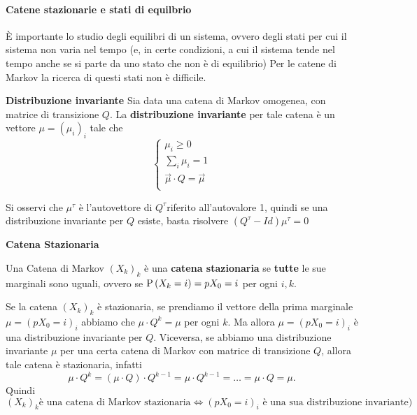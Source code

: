 \paragraph{Catene stazionarie e stati di equilbrio}

\`E importante lo studio degli equilibri di un sistema, ovvero degli stati per cui il sistema non varia nel tempo 
(e, in certe condizioni, a cui il sistema tende nel tempo anche se si parte da uno stato che non \`e di equilibrio)
Per le catene di Markov la ricerca di questi stati non \`e difficile. 

\begin{defn}
	\textbf{Distribuzione invariante}
	Sia data una catena di Markov omogenea, con  matrice di transizione $ Q $. 
	La \textbf{distribuzione invariante} 
	per tale catena \`e  un vettore $ {\mu} = (\mu_i)_i $ tale che 	
	\begin{equation*}
	\begin{cases}
	\mu_i \geq 0 \\
	\sum_i \mu_i = 1 \\
	\vec{\mu} \cdot Q = \vec{\mu} \\
	\end{cases}
	\end{equation*}
	\end{defn}
\begin{note}
Si osservi che $ {\mu}^\tau $ \`e  l'autovettore di $ Q^\tau$riferito all'autovalore 1,  quindi se una
distribuzione invariante per $Q$ esiste, basta risolvere $(Q^\tau-Id)\mu^\tau = 0$
\end{note}

\begin{defn}
	\textbf{Catena Stazionaria}
	
	Una Catena di Markov $(X_k)_k$ \`e  una \textbf{catena stazionaria} se \textbf{tutte} le sue marginali sono uguali, ovvero se $\text{P}\left(X_k=i\right)=p{X_0=i}$ per ogni $i,k$.
	\end{defn}
	
 Se la catena  $(X_k)_k$ \`e  stazionaria, se prendiamo il vettore della prima marginale 
	 $\mu=(p{X_0=i})_i$ abbiamo che $\mu\cdot Q^k=\mu$ per ogni $k$. Ma allora 
	 $\mu=(p{X_0=i})_i$  \`e una distribuzione invariante per $Q$. Viceversa, se abbiamo una distribuzione
	 invariante $\mu$ per una certa catena di Markov con matrice di transizione $Q$, allora tale 
	 catena \`e stazionaria, infatti
	 $$
	 \mu\cdot Q^k=(\mu\cdot Q)\cdot Q^{k-1}=\mu\cdot Q^{k-1}=\dots=\mu\cdot Q=\mu.
 $$
Quindi 
$$ (X_k)_k \text {\`e una catena di Markov stazionaria} \Leftrightarrow (p{X_0=i})_i
 \text{ \`e una sua distribuzione invariante)}
$$	 

